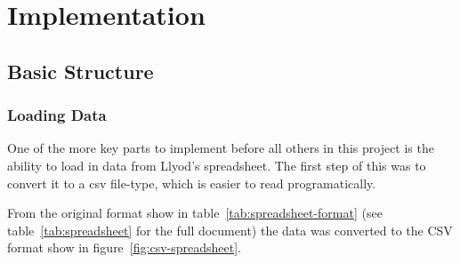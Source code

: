 \chapter{Implementation}



\section{Basic Structure}

\subsection{Loading Data}
One of the more key parts to implement before all others in this project is the ability to load in
data from Llyod's spreadsheet. The first step of this was to convert it to a \gls{csv} file-type,
which is easier to read programatically.

From the original format show in table~\ref{tab:spreadsheet-format} (see 
table~\ref{tab:spreadsheet} for the full document) the data was converted to the CSV format show
in figure~\ref{fig:csv-spreadsheet}.

\begin{table}[h]
\caption{Layout of the Painting Data Spreadsheet}\label{tab:spreadsheet-format}
\end{table}

